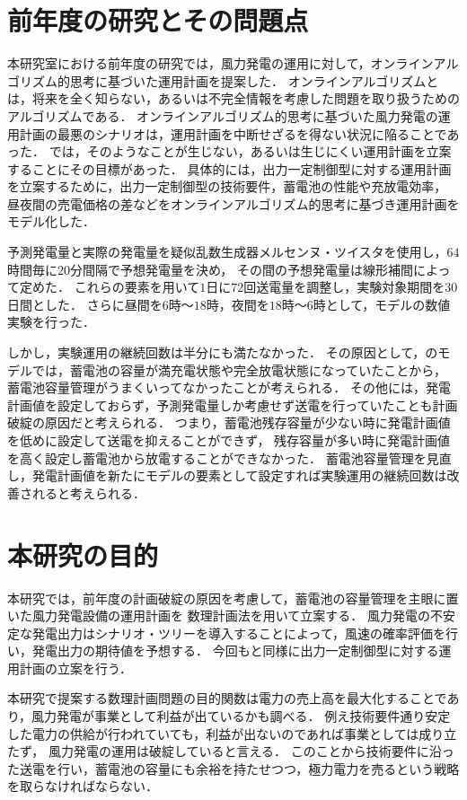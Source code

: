 \documentclass[a4paper,12pt,showkeys]{jreport}
\begin{document}
\section{前年度の研究とその問題点}

本研究室における前年度の研究\cite{徳谷}では，風力発電の運用に対して，オンラインアルゴリズム的思考に基づいた運用計画を提案した．
オンラインアルゴリズムとは，将来を全く知らない，あるいは不完全情報を考慮した問題を取り扱うためのアルゴリズムである．
オンラインアルゴリズム的思考に基づいた風力発電の運用計画の最悪のシナリオは，運用計画を中断せざるを得ない状況に陥ることであった．
\cite{徳谷}では，そのようなことが生じない，あるいは生じにくい運用計画を立案することにその目標があった．
具体的には，出力一定制御型に対する運用計画を立案するために，出力一定制御型の技術要件，蓄電池の性能や充放電効率，
昼夜間の売電価格の差などをオンラインアルゴリズム的思考に基づき運用計画をモデル化した．

予測発電量と実際の発電量を疑似乱数生成器メルセンヌ・ツイスタを使用し，$64$時間毎に$20$分間隔で予想発電量を決め，
その間の予想発電量は線形補間によって定めた．
これらの要素を用いて$1$日に$72$回送電量を調整し，実験対象期間を30日間とした．
さらに昼間を$6$時～$18$時，夜間を$18$時～$6$時として，モデルの数値実験を行った．

しかし，実験運用の継続回数は半分にも満たなかった．
その原因として，\cite{徳谷}のモデルでは，蓄電池の容量が満充電状態や完全放電状態になっていたことから，
蓄電池容量管理がうまくいってなかったことが考えられる．
その他には，発電計画値を設定しておらず，予測発電量しか考慮せず送電を行っていたことも計画破綻の原因だと考えられる．
つまり，蓄電池残存容量が少ない時に発電計画値を低めに設定して送電を抑えることができず，
残存容量が多い時に発電計画値を高く設定し蓄電池から放電することができなかった．
蓄電池容量管理を見直し，発電計画値を新たにモデルの要素として設定すれば実験運用の継続回数は改善されると考えられる．

\section{本研究の目的}
本研究では，前年度の計画破綻の原因を考慮して，蓄電池の容量管理を主眼に置いた風力発電設備の運用計画を
数理計画法を用いて立案する．
風力発電の不安定な発電出力はシナリオ・ツリーを導入することによって，風速の確率評価を行い，発電出力の期待値を予想する．
今回も\cite{徳谷}と同様に出力一定制御型に対する運用計画の立案を行う．

本研究で提案する数理計画問題の目的関数は電力の売上高を最大化することであり，風力発電が事業として利益が出ているかも調べる．
例え技術要件通り安定した電力の供給が行われていても，利益が出ないのであれば事業としては成り立たず，
風力発電の運用は破綻していると言える．
このことから技術要件に沿った送電を行い，蓄電池の容量にも余裕を持たせつつ，極力電力を売るという戦略を取らなければならない．
\end{document}

